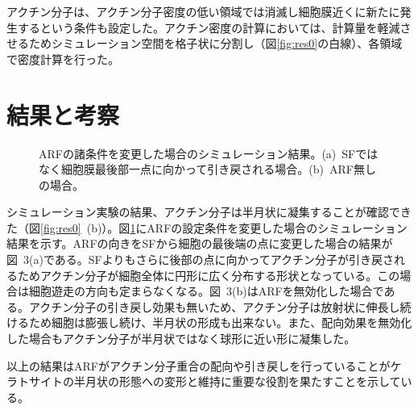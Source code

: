 \documentclass[10pt,twocolumn,a4j]{jarticle}
\begin{document}
アクチン分子は、アクチン分子密度の低い領域では消滅し細胞膜近くに新たに発生するという条件も設定した。アクチン密度の計算においては、計算量を軽減させるためシミュレーション空間を格子状に分割し（図\ref{fig:res0}の白線）、各領域で密度計算を行った。
\section{結果と考察}
\begin{figure}[tbp]
\centering
  \caption{ARFの諸条件を変更した場合のシミュレーション結果。(a)~SFではなく細胞膜最後部一点に向かって引き戻される場合。(b)~ARF無しの場合。}
 \label{fig:res1}
\end{figure}
シミュレーション実験の結果、アクチン分子は半月状に凝集することが確認できた（図\ref{fig:res0}~(b)）。図\ref{fig:res1}にARFの設定条件を変更した場合のシミュレーション結果を示す。ARFの向きをSFから細胞の最後端の点に変更した場合の結果が図~3(a)である。SFよりもさらに後部の点に向かってアクチン分子が引き戻されるためアクチン分子が細胞全体に円形に広く分布する形状となっている。この場合は細胞遊走の方向も定まらなくなる。図~3(b)はARFを無効化した場合である。アクチン分子の引き戻し効果も無いため、アクチン分子は放射状に伸長し続けるため細胞は膨張し続け、半月状の形成も出来ない。また、配向効果を無効化した場合もアクチン分子が半月状ではなく球形に近い形に凝集した。

以上の結果はARFがアクチン分子重合の配向や引き戻しを行っていることがケラトサイトの半月状の形態への変形と維持に重要な役割を果たすことを示している。
\end{document}
